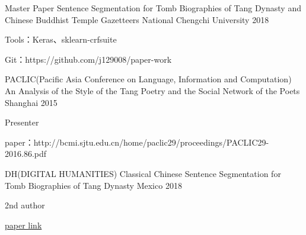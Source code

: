 

\begin{cventries}
  \cventry
    {Master Paper} %
    {Sentence Segmentation for Tomb Biographies of Tang Dynasty and Chinese Buddhist Temple Gazetteers} %
    {National Chengchi University} %
    {2018} %
    {
      \begin{cvitems} %
        \item {Tools：Keras、sklearn-crfsuite}
        \item {Git：https://github.com/j129008/paper-work}
      \end{cvitems}
    }


  \cventry
    {PACLIC(Pacific Asia Conference on Language, Information and Computation)} %
    {An Analysis of the Style of the Tang Poetry and the Social Network of the Poets}
    {Shanghai} %
    {2015} %
    {
      \begin{cvitems} %
        \item {Presenter} %
        \item {paper：http://bcmi.sjtu.edu.cn/home/paclic29/proceedings/PACLIC29-2016.86.pdf}
      \end{cvitems}
    }


  \cventry
    {DH(DIGITAL HUMANITIES)} %
    {Classical Chinese Sentence Segmentation for Tomb Biographies of Tang Dynasty} %
    {Mexico} %
    {2018} %
    {
      \begin{cvitems} %
      \item {2nd author} %
      \item {
            \href {https://dh2018.adho.org/classical-chinese-sentence-segmentation-for-tomb-biographies-of-tang-dynasty/}{paper link}
         }
      \end{cvitems}
    }

\end{cventries}
